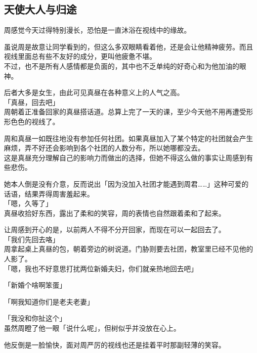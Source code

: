 \subsection{天使大人与归途}

周感觉今天过得特别漫长，恐怕是一直沐浴在视线中的缘故。

虽说周是故意让同学看到的，但这么多双眼睛看着他，还是会让他精神疲劳。而且视线里面总有些不友好的成分，更叫他疲惫不堪。\\

不过，也不是所有人感情都是负面的，其中也不乏单纯的好奇心和为他加油的眼神。

后者大多是女生，由此可见真昼在各种意义上的人气之高。\\

「真昼，回去吧」\\

周朝着正准备回家的真昼搭话道。总算上完了一天的课，至少今天他不用再遭受形形色色的视线了。

周和真昼一如既往地没有参加任何社团。如果真昼加入了某个特定的社团就会产生麻烦，弄不好还会影响到各个社团的人数分布，所以她哪都没去。\\

这是真昼充分理解自己的影响力而做出的选择，但她不得这么做的事实让周感到有些悲伤。

她本人倒是没有介意，反而说出「因为没加入社团才能遇到周君……」这种可爱的话语，结果弄得周害羞起来。\\

「嗯，久等了」\\

真昼收拾好东西，露出了柔和的笑容，周的表情也自然跟着柔和了起来。

让周感到开心的是，以前两人不得不分开回家，而现在可以一起回去了。\\

「我们先回去咯」\\

周拿起桌上真昼的包，朝着旁边的树说道。门胁则要去社团，教室里已经不见他的人影了。\\

「嗯，我也不好意思打扰两位新婚夫妇，你们就亲热地回去吧」

「新婚个啥啊笨蛋」

「啊我知道你们是老夫老妻」

「我没和你扯这个」\\

虽然周瞪了他一眼「说什么呢」，但树似乎并没放在心上。

他反倒是一脸愉快，面对周严厉的视线也还是挂着平时那副轻薄的笑容。\\

